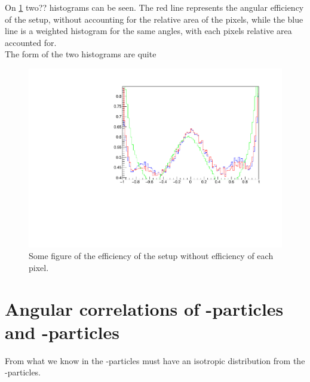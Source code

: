 On \cref{fig:effwithweight} two?? histograms can be seen. The red line represents the angular efficiency of the setup, without accounting for the relative area of the pixels, while the blue line is a weighted histogram for the same angles, with each pixels relative area accounted for. \\
The form of the two histograms are quite  
\begin{figure}[h]
	\includegraphics[width=\linewidth]{../figures/betaAngles/dataEffNormWithWeights.pdf}
	\caption{Some figure of the efficiency of the setup without efficiency of each pixel. }
	\label{fig:effwithweight}
\end{figure}


\section{Angular correlations of \al-particles and \be-particles}
From what we know in  the \be-particles must have an isotropic distribution from the \al-particles. 

